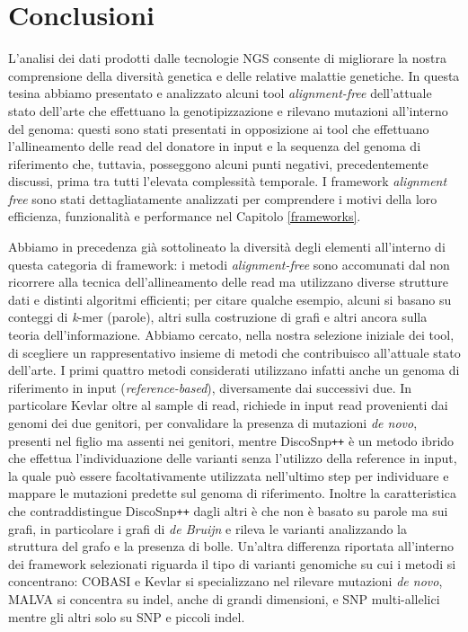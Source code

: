 \documentclass[../main.tex]{subfiles}
\begin{document}
\section{Conclusioni}

L'analisi dei dati prodotti dalle tecnologie NGS consente di migliorare la nostra comprensione della diversità genetica e delle relative malattie genetiche. In questa tesina abbiamo presentato e analizzato alcuni tool \textit{alignment-free} dell'attuale stato dell'arte che effettuano la genotipizzazione e rilevano mutazioni all'interno del genoma: questi sono stati presentati in opposizione ai tool che effettuano l'allineamento delle read del donatore in input e la sequenza del genoma di riferimento che, tuttavia, posseggono alcuni punti negativi, precedentemente discussi, prima tra tutti l'elevata complessità temporale. I framework \textit{alignment free} sono stati dettagliatamente analizzati per comprendere i motivi della loro efficienza, funzionalità e performance nel Capitolo \ref{frameworks}.

Abbiamo in precedenza già sottolineato la diversità degli elementi all'interno di questa categoria di framework: i metodi \textit{alignment-free} sono accomunati dal non ricorrere alla tecnica dell'allineamento delle read ma utilizzano diverse strutture dati e distinti algoritmi efficienti; per citare qualche esempio, alcuni si basano su conteggi di \textit{k}-mer (parole), altri sulla costruzione di grafi e altri ancora sulla teoria dell'informazione. Abbiamo cercato, nella nostra selezione iniziale dei tool, di scegliere un rappresentativo insieme di metodi che contribuisco all'attuale stato dell'arte. I primi quattro metodi considerati utilizzano infatti anche un genoma di riferimento in input (\textit{reference-based}), diversamente dai successivi due. In particolare Kevlar \cite{standage2019kevlar} oltre al sample di read, richiede in input read provenienti dai genomi dei due genitori, per convalidare la presenza di mutazioni \textit{de novo}, presenti nel figlio ma assenti nei genitori, mentre DiscoSnp\texttt{++} \cite{peterlongo2017discosnp++} è un metodo ibrido che effettua l'individuazione delle varianti senza l'utilizzo della reference in input, la quale può essere facoltativamente utilizzata nell'ultimo step per individuare e mappare le mutazioni predette sul genoma di riferimento. Inoltre la caratteristica che contraddistingue DiscoSnp\texttt{++} dagli altri è che non è basato su parole ma sui grafi, in particolare i grafi di \textit{de Bruijn} e rileva le varianti analizzando la struttura del grafo e la presenza di bolle. Un'altra differenza riportata all'interno dei framework selezionati riguarda il tipo di varianti genomiche su cui i metodi si concentrano: COBASI \cite{gomez-romero2018cobasi} e Kevlar si specializzano nel rilevare mutazioni \textit{de novo}, MALVA  \cite{bernardini2019malva} si concentra su indel, anche di grandi dimensioni, e SNP multi-allelici mentre gli altri solo su SNP e piccoli indel.
\end{document}

